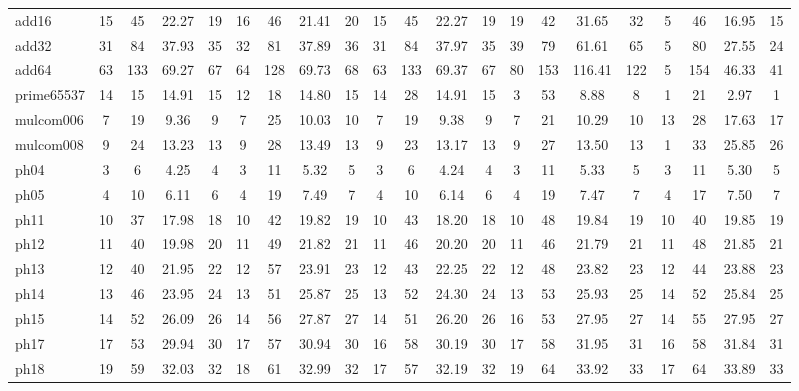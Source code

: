 \documentclass[runningheads]{llncs}
\begin{document}
\begin{table}[]
{\begin{tabular}{ l|c  c c c| c c c c | c c c c | c c c c | c c c c|}
			add16 & 15 & 45 & 22.27 & 19 & 16 & 46 & 21.41 & 20 & 15 & 45 & 22.27 & 19 & 19 & 42 & 31.65 & 32 & 5 & 46 & 16.95 &  \cellcolor{gold}15 \\\cline{1-21}  
			add32 & 31 & 84 & 37.93 & 35 & 32 & 81 & 37.89 & 36 & 31 & 84 & 37.97 & 35 & 39 & 79 & 61.61 & 65 & 5 & 80 & 27.55 & \cellcolor{gold}24 \\\cline{1-21}  
			add64 & 63 & 133 & 69.27 & 67 & 64 & 128 & 69.73 & 68 & 63 & 133 & 69.37 & 67 & 80 & 153 & 116.41 & 122 & 5 & 154 & 46.33 & \cellcolor{gold}41 \\\cline{1-21}  
			prime65537 & 14 & 15 & 14.91 & 15 & 12 & 18 & 14.80 & 15 & 14 & 28 & 14.91 & 15 & 3 & 53 & 8.88 & 8 & 1 & 21 & 2.97 & \cellcolor{gold}1 \\\cline{1-21} \hline\hline  
			mulcom006 & 7 & 19 & 9.36 & 9 & 7 & 25 & 10.03 & 10 & 7 & 19 & 9.38 & 9 & 7 & 21 & 10.29 & 10 & 13 & 28 & 17.63 & 17 \\\cline{1-21}  
			mulcom008 & 9 & 24 & 13.23 & 13 & 9 & 28 & 13.49 & 13 & 9 & 23 & 13.17 & 13 & 9 & 27 & 13.50 & 13 & 1 & 33 & 25.85 & 26 \\\cline{1-21}  
			ph04 & 3 & 6 & 4.25 & 4 & 3 & 11 & 5.32 & 5 & 3 & 6 & 4.24 & 4 & 3 & 11 & 5.33 & 5 & 3 & 11 & 5.30 & 5 \\\cline{1-21}  
			ph05 & 4 & 10 & 6.11 & 6 & 4 & 19 & 7.49 & 7 & 4 & 10 & 6.14 & 6 & 4 & 19 & 7.47 & 7 & 4 & 17 & 7.50 & 7 \\\cline{1-21}  
			ph11 & 10 & 37 & 17.98 & 18 & 10 & 42 & 19.82 & 19 & 10 & 43 & 18.20 & 18 & 10 & 48 & 19.84 & 19 & 10 & 40 & 19.85 & 19 \\\cline{1-21}  
			ph12 & 11 & 40 & 19.98 & 20 & 11 & 49 & 21.82 & 21 & 11 & 46 & 20.20 & 20 & 11 & 46 & 21.79 & 21 & 11 & 48 & 21.85 & 21 \\\cline{1-21}  
			ph13 & 12 & 40 & 21.95 & 22 & 12 & 57 & 23.91 & 23 & 12 & 43 & 22.25 & 22 & 12 & 48 & 23.82 & 23 & 12 & 44 & 23.88 & 23 \\\cline{1-21}  
			ph14 & 13 & 46 & 23.95 & 24 & 13 & 51 & 25.87 & 25 & 13 & 52 & 24.30 & 24 & 13 & 53 & 25.93 & 25 & 14 & 52 & 25.84 & 25 \\\cline{1-21}  
			ph15 & 14 & 52 & 26.09 & 26 & 14 & 56 & 27.87 & 27 & 14 & 51 & 26.20 & 26 & 16 & 53 & 27.95 & 27 & 14 & 55 & 27.95 & 27 \\\cline{1-21}  
			ph17 & 17 & 53 & 29.94 & 30 & 17 & 57 & 30.94 & 30 & 16 & 58 & 30.19 & 30 & 17 & 58 & 31.95 & 31 & 16 & 58 & 31.84 & 31 \\\cline{1-21}  
			ph18 & 19 & 59 & 32.03 & 32 & 18 & 61 & 32.99 & 32 & 17 & 57 & 32.19 & 32 & 19 & 64 & 33.92 & 33 & 17 & 64 & 33.89 & 33 \\\cline{1-21}  

\end{tabular}}
\end{table}
\end{document}
